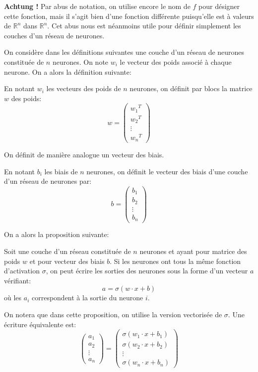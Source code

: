 \textbf{Achtung !} Par abus de notation, on utilise encore le nom de $f$ pour désigner 
cette fonction, mais il s'agit bien d'une fonction différente puisqu'elle est à valeurs 
de $\mathbb{R}^n$ dans $\mathbb{R}^n$. Cet abus nous est néanmoins utile pour définir 
simplement les couches d'un réseau de neurones.

On considère dans les définitions suivantes une couche d'un réseau de neurones 
constituée de $n$ neurones. On note $w_i$ le vecteur des poids associé à chaque neurone.
On a alors la définition suivante:
 
\begin{definition}
En notant $w_i$ les vecteurs des poids de $n$ neurones, on définit par blocs 
la matrice $w$ des poids:
\[
w = 
\begin{pmatrix}
{w_1}^T \\
{w_2}^T \\
\vdots \\
{w_n}^T
\end{pmatrix}
\]
\end{definition}

On définit de manière analogue un vecteur des biais.

\begin{definition}
En notant $b_i$ les biais de $n$ neurones, on définit le vecteur des biais 
d'une couche d'un réseau de neurones par:
\[
b = 
\begin{pmatrix}
{b_1} \\
{b_2} \\
\vdots \\
{b_n}
\end{pmatrix}
\]
\end{definition}

On a alors la proposition suivante:

\begin{proposition}
Soit une couche d'un réseau constituée de $n$ neurones et ayant pour matrice 
des poids $w$ et pour vecteur des biais $b$. Si les neurones ont tous la même 
fonction d'activation $\sigma$, on peut écrire les sorties des neurones sous la 
forme d'un vecteur $a$ vérifiant:
\[
a = \sigma(w \cdot x + b)
\]
où les $a_i$ correspondent à la sortie du neurone $i$.
\end{proposition}

On notera que dans cette proposition, on utilise la version vectorisée de $\sigma$.
Une écriture équivalente est:
\[
\begin{pmatrix}
  a_1 \\
  a_2 \\
  \vdots \\
  a_n
\end{pmatrix}
 = 
\begin{pmatrix}
  \sigma(w_1 \cdot x + b_1) \\
  \sigma(w_2 \cdot x + b_2) \\
  \vdots \\
  \sigma(w_n \cdot x + b_n)
\end{pmatrix}
\]


